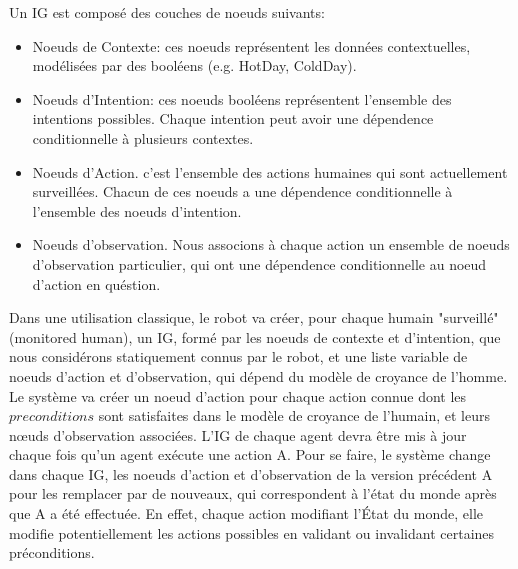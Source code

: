 \documentclass[a4paper,11pt,twoside]{StyleThese}
\begin{document}
Un IG est composé des couches de noeuds suivants:
\begin{itemize}
\item Noeuds de Contexte: ces noeuds représentent les données contextuelles, modélisées par des booléens (e.g. HotDay, ColdDay).
\item Noeuds d'Intention: ces noeuds booléens représentent l'ensemble des intentions possibles. Chaque intention peut avoir une dépendence conditionnelle à plusieurs contextes.
\item Noeuds d'Action. c'est l'ensemble des actions humaines qui sont actuellement surveillées. Chacun de ces noeuds a une dépendence conditionnelle à l'ensemble des noeuds d'intention.
\item Noeuds d'observation. Nous associons à chaque action un ensemble de noeuds d'observation particulier, qui ont une dépendence conditionnelle au noeud d'action en quéstion. 
\end{itemize}


Dans une utilisation classique, le robot va créer, pour chaque humain "surveillé" (monitored human), un IG, formé par les noeuds de contexte et d'intention, que nous considérons statiquement connus par le robot, et une liste variable de noeuds d'action et d'observation, qui dépend du modèle de croyance de l'homme. Le système va créer un noeud d'action pour chaque action connue dont les  $preconditions$ sont satisfaites dans le modèle de croyance de l'humain, et leurs nœuds d'observation associées. L'IG de chaque agent devra être mis à jour chaque fois qu'un agent exécute une action A. Pour se faire, le système change dans chaque IG, les noeuds d'action et d'observation de la version précédent A pour les remplacer par de nouveaux, qui correspondent à l'état du monde après que A a été effectuée. En effet, chaque action modifiant l'État du monde, elle modifie potentiellement les actions possibles en validant ou invalidant certaines préconditions.
\end{document}

